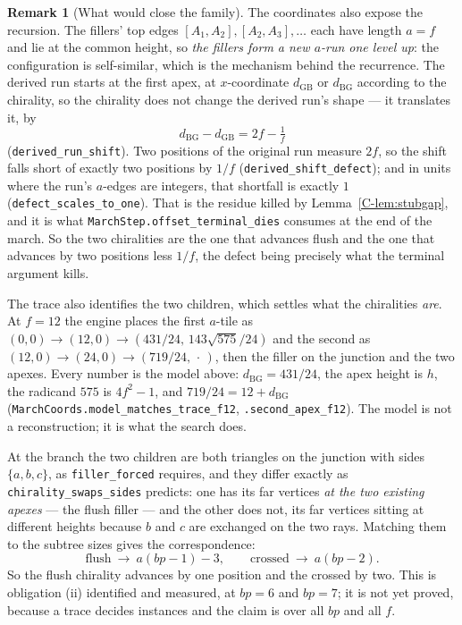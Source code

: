 \documentclass[11pt,reqno]{amsart}
\theoremstyle{plain}
\theoremstyle{definition}
\newtheorem{remark}[theorem]{Remark}
\begin{document}
\begin{remark}[What would close the family]
\medskip
The coordinates also expose the recursion. The fillers' top edges $[A_1,A_2],[A_2,A_3],\dots$ each
have length $a=f$ and lie at the common height, so \emph{the fillers form a new $a$-run one level
up}: the configuration is self-similar, which is the mechanism behind the recurrence. The derived
run starts at the first apex, at $x$-coordinate $d_{\mathrm{GB}}$ or $d_{\mathrm{BG}}$ according to
the chirality, so the chirality does not change the derived run's shape --- it translates it, by
\[
d_{\mathrm{BG}}-d_{\mathrm{GB}}=2f-\tfrac1f
\]
(\texttt{derived\_run\_shift}). Two positions of the original run measure $2f$, so the shift falls
short of exactly two positions by $1/f$ (\texttt{derived\_shift\_defect}); and in units where the
run's $a$-edges are integers, that shortfall is exactly $1$
(\texttt{defect\_scales\_to\_one}). That is the residue killed by
Lemma~\ref{C-lem:stubgap}, and it is what \texttt{MarchStep.offset\_terminal\_dies} consumes at the
end of the march. So the two chiralities are the one that advances flush and the one that advances
by two positions less $1/f$, the defect being precisely what the terminal argument kills.

\medskip
The trace also identifies the two children, which settles what the chiralities \emph{are}. At
$f=12$ the engine places the first $a$-tile as $(0,0)\to(12,0)\to(431/24,\,143\sqrt{575}/24)$ and
the second as $(12,0)\to(24,0)\to(719/24,\,\cdot\,)$, then the filler on the junction and the two
apexes. Every number is the model above: $d_{\mathrm{BG}}=431/24$, the apex height is $h$, the
radicand $575$ is $4f^2-1$, and $719/24=12+d_{\mathrm{BG}}$
(\texttt{MarchCoords.model\_matches\_trace\_f12}, \texttt{.second\_apex\_f12}). The model is not a
reconstruction; it is what the search does.

At the branch the two children are both triangles on the junction with sides $\{a,b,c\}$, as
\texttt{filler\_forced} requires, and they differ exactly as \texttt{chirality\_swaps\_sides}
predicts: one has its far vertices \emph{at the two existing apexes} --- the flush filler --- and the
other does not, its far vertices sitting at different heights because $b$ and $c$ are exchanged on
the two rays. Matching them to the subtree sizes gives the correspondence:
\[
\text{flush}\ \longrightarrow\ a(bp-1)-3,\qquad
\text{crossed}\ \longrightarrow\ a(bp-2).
\]
So the flush chirality advances by one position and the crossed by two. This is obligation (ii)
identified and measured, at $bp=6$ and $bp=7$; it is not yet proved, because a trace decides
instances and the claim is over all $bp$ and all $f$.


\end{remark}
\end{document}
